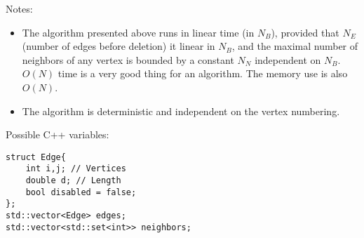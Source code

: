 \documentclass{article}
\begin{document}
Notes:
\begin{itemize}
\item The algorithm presented above runs in linear time (in $N_B$), provided that $N_E$
(number of edges before deletion) it linear in $N_B$, and the maximal number of neighbors of any vertex
is bounded by a constant $N_N$ independent on $N_B$. $O(N)$
time is a very good thing for an algorithm. The memory use is also $O(N)$.
%
\item The algorithm is deterministic and independent on the vertex numbering.
% 
\end{itemize}

Possible C++ variables:
\begin{verbatim}
struct Edge{
    int i,j; // Vertices
    double d; // Length
    bool disabled = false;
};
std::vector<Edge> edges;
std::vector<std::set<int>> neighbors;
\end{verbatim}
\end{document}
